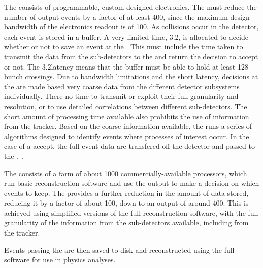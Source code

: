 The \LI consists of programmable, custom-designed electronics. The \LI must reduce the number of output events by a factor of at least 400, since the maximum design bandwidth of the \subdetector electronics readout is of 100\kHz. As collisions occur in the \CMS detector, each event is stored in a buffer. A very limited time, 3.2\us, is allocated to decide whether or not to save an event at the \LI. This must include the time taken to transmit the data from the sub-detectors to the \LI and return the decision to accept or not. The 3.2\us latency means that the buffer must be able to hold at least 128 bunch crossings. Due to bandwidth limitations and the short latency, decisions at the \LI are made based very coarse data from the different detector subsystems individually. There no time to transmit or exploit their full granularity and resolution, or to use detailed correlations between different sub-detectors. The short amount of processing time available also prohibits the use of information from the tracker. Based on the coarse information available, the \LI runs a series of algorithms designed to identify events where processes of interest occur. In the case of a \LI accept, the full event data are transfered off the detector and passed to the \HLT.~\cite{CMSatLHC}.

The \HLT consists of a farm of about 1000 commercially-available processors, which run basic reconstruction software and use the output to make a decision on which events to keep. The \HLT provides a further reduction in the amount of data stored, reducing it by a factor of about 100, down to an output of around 400\Hz. This is achieved using simplified versions of the full \CMS reconstruction software, with the full granularity of the information from the \CMS sub-detectors available, including from the tracker.~\cite{CMSatLHC}

Events passing the \HLT are then saved to disk and reconstructed using the full \CMS software for use in physics analyses.

